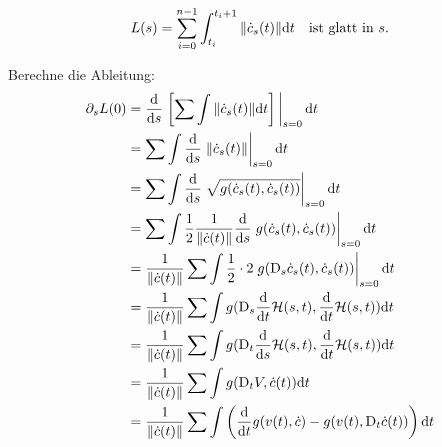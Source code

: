 \begin{bew}
\begin{align*}
L(s) = \sum_{i=0}^{n-1} \int_{t_i}^{t_i+1}\norm{\dot{c}_s(t)} \dd t \quad \text{ist glatt in $s$.}
\end{align*}

Berechne die Ableitung:
\begin{align*}
\partial_sL(0) &= \frac{\dd}{\dd s}\eval{\left[\sum \int \norm{\dot{c}_s(t)} \dd t\right]}_{s=0} \dd t \\
&= \sum \int \frac{\dd}{\dd s} \eval{\norm{\dot{c}_s(t)}}_{s=0} \dd t \\
&= \sum \int \frac{\dd}{\dd s} \eval{\sqrt{g(\dot{c}_s(t),\dot{c}_s(t))}}_{s=0} \dd t \\
&= \sum \int \frac{1}{2} \frac{1}{\norm{\dot{c}(t)}}\frac{\dd}{\dd s}\eval{g(\dot{c}_s(t),\dot{c}_s(t))}_{s=0} \dd t \\
&=\frac{1}{\norm{\dot{c}(t)}}\sum\int\frac{1}{2}\cdot 2\eval{g(\covd_s\dot{c}_s(t),\dot{c}_s(t))}_{s=0} \dd t \\
&=\frac{1}{\norm{\dot{c}(t)}}\sum\int g(\covd_s \frac{\dd}{\dd t}\mathcal{H}(s, t), \frac{\dd}{\dd t} \mathcal{H}(s, t)) \dd t \\
&=\frac{1}{\norm{\dot{c}(t)}}\sum\int g(\covd_t \frac{\dd}{\dd s}\mathcal{H}(s, t), \frac{\dd}{\dd t} \mathcal{H}(s, t)) \dd t \\
&=\frac{1}{\norm{\dot{c}(t)}}\sum\int g(\covd_tV, \dot{c}(t)) \dd t \\
&=\frac{1}{\norm{\dot{c}(t)}}\sum\int \left(\frac{\dd}{\dd t}g(v(t), \dot{c})-g(v(t),\covd_t\dot{c}(t))\right) \dd t
\end{align*}
\end{bew}

